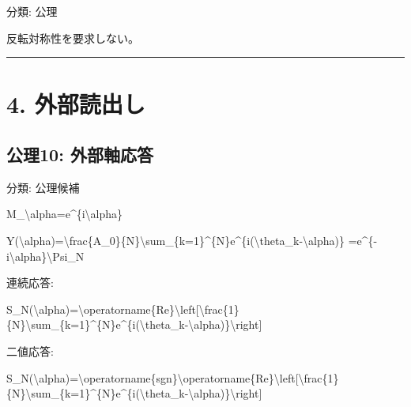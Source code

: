 \documentclass[
  a4paper,
]{ltjsarticle}
\newenvironment{Shaded}{}{}
\newcommand{\NormalTok}[1]{#1}
\begin{document}
分類: 公理

反転対称性を要求しない。

\begin{center}\rule{0.5\linewidth}{0.5pt}\end{center}

\section{4. 外部読出し}\label{ux5916ux90e8ux8aadux51faux3057}

\subsection{公理10:
外部軸応答}\label{ux516cux740610-ux5916ux90e8ux8ef8ux5fdcux7b54}

分類: 公理候補

\begin{Shaded}
\begin{Highlighting}[]
\NormalTok{M\_\textbackslash{}alpha=e\^{}\{i\textbackslash{}alpha\}}
\end{Highlighting}
\end{Shaded}

\begin{Shaded}
\begin{Highlighting}[]
\NormalTok{Y(\textbackslash{}alpha)=\textbackslash{}frac\{A\_0\}\{N\}\textbackslash{}sum\_\{k=1\}\^{}\{N\}e\^{}\{i(\textbackslash{}theta\_k{-}\textbackslash{}alpha)\}}
\NormalTok{=e\^{}\{{-}i\textbackslash{}alpha\}\textbackslash{}Psi\_N}
\end{Highlighting}
\end{Shaded}

連続応答:

\begin{Shaded}
\begin{Highlighting}[]
\NormalTok{S\_N(\textbackslash{}alpha)=\textbackslash{}operatorname\{Re\}\textbackslash{}left[\textbackslash{}frac\{1\}\{N\}\textbackslash{}sum\_\{k=1\}\^{}\{N\}e\^{}\{i(\textbackslash{}theta\_k{-}\textbackslash{}alpha)\}\textbackslash{}right]}
\end{Highlighting}
\end{Shaded}

二値応答:

\begin{Shaded}
\begin{Highlighting}[]
\NormalTok{S\_N(\textbackslash{}alpha)=\textbackslash{}operatorname\{sgn\}\textbackslash{}operatorname\{Re\}\textbackslash{}left[\textbackslash{}frac\{1\}\{N\}\textbackslash{}sum\_\{k=1\}\^{}\{N\}e\^{}\{i(\textbackslash{}theta\_k{-}\textbackslash{}alpha)\}\textbackslash{}right]}
\end{Highlighting}
\end{Shaded}
\end{document}
